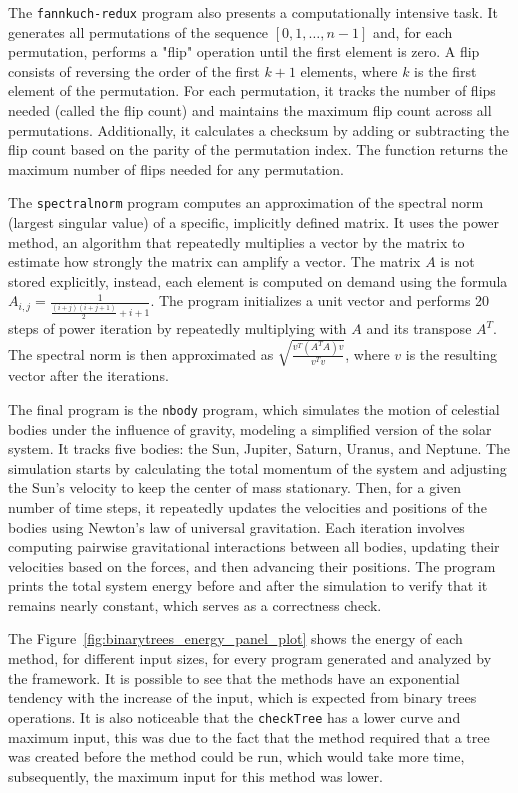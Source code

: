 {\color{blue}The \texttt{fannkuch-redux} program also presents a computationally intensive task. It generates all permutations of the sequence \([0, 1, \ldots, n-1]\) and, for each permutation, performs a "flip" operation until the first element is zero. A flip consists of reversing the order of the first \(k + 1\) elements, where \(k\) is the first element of the permutation. For each permutation, it tracks the number of flips needed (called the flip count) and maintains the maximum flip count across all permutations. Additionally, it calculates a checksum by adding or subtracting the flip count based on the parity of the permutation index. The function returns the maximum number of flips needed for any permutation.

The \texttt{spectralnorm} program computes an approximation of the spectral norm (largest singular value) of a specific, implicitly defined matrix. It uses the power method, an algorithm that repeatedly multiplies a vector by the matrix to estimate how strongly the matrix can amplify a vector. The matrix \(A\) is not stored explicitly, instead, each element is computed on demand using the formula \(A_{i,j} = \frac{1}{\frac{(i + j)(i + j + 1)}{2} + i + 1}\). The program initializes a unit vector and performs 20 steps of power iteration by repeatedly multiplying with \(A\) and its transpose \(A^T\). The spectral norm is then approximated as \(\sqrt{\frac{v^T (A^T A) v}{v^T v}}\), where \(v\) is the resulting vector after the iterations. 

The final program is the \texttt{nbody} program, which simulates the motion of celestial bodies under the influence of gravity, modeling a simplified version of the solar system. It tracks five bodies: the Sun, Jupiter, Saturn, Uranus, and Neptune. The simulation starts by calculating the total momentum of the system and adjusting the Sun’s velocity to keep the center of mass stationary. Then, for a given number of time steps, it repeatedly updates the velocities and positions of the bodies using Newton’s law of universal gravitation. Each iteration involves computing pairwise gravitational interactions between all bodies, updating their velocities based on the forces, and then advancing their positions. The program prints the total system energy before and after the simulation to verify that it remains nearly constant, which serves as a correctness check. 
}


The Figure~\ref{fig:binarytrees_energy_panel_plot}  shows the energy of each method, for different input sizes, for every program generated and analyzed by the framework. It is possible to see that the methods have an exponential tendency with the increase of the input, which is expected from binary trees operations. It is also noticeable that the \texttt{checkTree} has a lower curve and maximum input, this was due to the fact that the method required that a tree was created before the method could be run, which would take more time, subsequently, the maximum input for this method was lower. 

